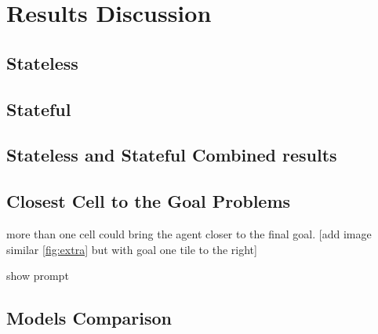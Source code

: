 \chapter{Results Discussion}
\label{cha:results_discussion}

\section{Stateless}
\label{sec:stateless}

\section{Stateful}
\label{sec:stateful}

\section{Stateless and Stateful Combined results}
\label{sec:stateless_and_stateful_combined_results}

\section{Closest Cell to the Goal Problems}
\label{sec:closest_cell_to_the_goal_problems} more than one cell could bring the
agent closer to the final goal. [add image similar \ref{fig:extra} but with goal
one tile to the right]

show prompt

\section{Models Comparison}
\label{sec:models_comparison}